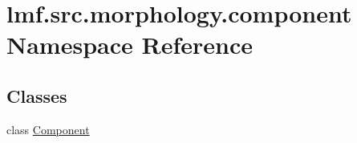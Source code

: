 \hypertarget{namespacelmf_1_1src_1_1morphology_1_1component}{\section{lmf.\+src.\+morphology.\+component Namespace Reference}
\label{namespacelmf_1_1src_1_1morphology_1_1component}
}
\subsection*{Classes}
\begin{DoxyCompactItemize}
\item 
class \hyperlink{classlmf_1_1src_1_1morphology_1_1component_1_1_component}{Component}
\end{DoxyCompactItemize}
